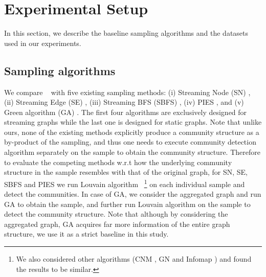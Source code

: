 

\section{Experimental Setup}
In this section, we describe the baseline sampling algorithms and the datasets used in our experiments.

\subsection{Sampling algorithms}
We compare \compas~ with five existing sampling methods: (i) Streaming Node (SN) \cite{ahmed2014network}, (ii) Streaming Edge (SE) \cite{ahmed2014network}, (iii) Streaming BFS (SBFS) \cite{ahmed2014network}, (iv) PIES \cite{ahmed2014network}, and (v) Green algorithm (GA) \cite{tong2016novel}. The first four algorithms are exclusively designed for streaming graphs while the last one is designed for static graphs. Note that unlike ours, none of the existing methods explicitly produce a community structure as a by-product of the sampling,
and thus one needs to execute community detection algorithm separately on the sample to obtain the community structure. Therefore to evaluate the competing methods w.r.t how the underlying community structure in the sample resembles with that of the original graph, for SN, SE, SBFS and PIES we run Louvain algorithm~\cite{blondel2008fast}
\footnote{We also considered other algorithms (CNM \cite{clauset2004finding}, GN \cite{girvan2002community} and Infomap \cite{rosvall2008maps}) and found the results to be similar.} 
on each individual sample and detect the communities. In case of GA, we consider the aggregated graph and run GA to obtain the sample, and further run Louvain algorithm on the sample to detect the community structure. 
Note that although by considering the aggregated graph, GA acquires far more information of the entire graph structure, we use it as a strict baseline in this study.

